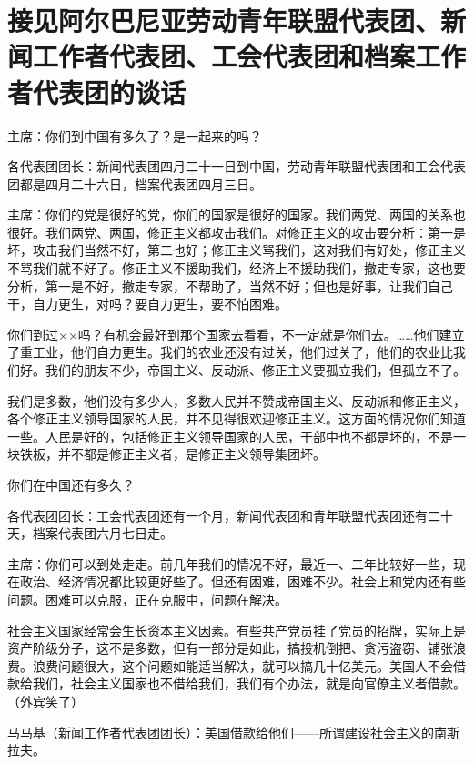 \section[接见阿尔巴尼亚劳动青年联盟代表团、新闻工作者代表团、工会代表团和档案工作者代表团的谈话（一九六三年五月四日）]{接见阿尔巴尼亚劳动青年联盟代表团、新闻工作者代表团、工会代表团和档案工作者代表团的谈话}


主席：你们到中国有多久了？是一起来的吗？

各代表团团长：新闻代表团四月二十一日到中国，劳动青年联盟代表团和工会代表团都是四月二十六日，档案代表团四月三日。

主席：你们的党是很好的党，你们的国家是很好的国家。我们两党、两国的关系也很好。我们两党、两国，修正主义都攻击我们。对修正主义的攻击要分析：第一是坏，攻击我们当然不好，第二也好；修正主义骂我们，这对我们有好处，修正主义不骂我们就不好了。修正主义不援助我们，经济上不援助我们，撤走专家，这也要分析，第一是不好，撤走专家，不帮助了，当然不好；但也是好事，让我们自己干，自力更生，对吗？要自力更生，要不怕困难。

你们到过××吗？有机会最好到那个国家去看看，不一定就是你们去。……他们建立了重工业，他们自力更生。我们的农业还没有过关，他们过关了，他们的农业比我们好。我们的朋友不少，帝国主义、反动派、修正主义要孤立我们，但孤立不了。

我们是多数，他们没有多少人，多数人民并不赞成帝国主义、反动派和修正主义，各个修正主义领导国家的人民，并不见得很欢迎修正主义。这方面的情况你们知道一些。人民是好的，包括修正主义领导国家的人民，干部中也不都是坏的，不是一块铁板，并不都是修正主义者，是修正主义领导集团坏。

你们在中国还有多久？

各代表团团长：工会代表团还有一个月，新闻代表团和青年联盟代表团还有二十天，档案代表团六月七日走。

主席：你们可以到处走走。前几年我们的情况不好，最近一、二年比较好一些，现在政治、经济情况都比较更好些了。但还有困难，困难不少。社会上和党内还有些问题。困难可以克服，正在克服中，问题在解决。

社会主义国家经常会生长资本主义因素。有些共产党员挂了党员的招牌，实际上是资产阶级分子，这不是多数，但有一部分是如此，搞投机倒把、贪污盗窃、铺张浪费。浪费问题很大，这个问题如能适当解决，就可以搞几十亿美元。美国人不会借款给我们，社会主义国家也不借给我们，我们有个办法，就是向官僚主义者借款。（外宾笑了）

马马基（新闻工作者代表团团长）：美国借款给他们——所谓建设社会主义的南斯拉夫。

